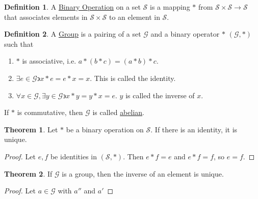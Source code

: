 \documentclass{article}
\newcommand{\Group}{\mathcal{G}}
\theoremstyle{definition}
\newtheorem{definition}{Definition}[section]
\newtheorem{theorem}{Theorem}[section]
\begin{document}
    \theoremstyle{definition}
    \begin{definition}
        A \underline{Binary Operation} on a set $\mathcal{S}$ is a mapping $*$ from
        $\mathcal{S}\times\mathcal{S}\to\mathcal{S}$ that associates elements in $\mathcal{S}\times\mathcal{S}$ to an
        element in $\mathcal{S}$.
    \end{definition}

    \theoremstyle{definition}
    \begin{definition}
        A \underline{Group} is a pairing of a set $\Group$ and a binary operator $*$ $(\Group,*)$ such that
        \begin{enumerate}
            \item $*$ is associative, i.e. $a*(b*c) = (a*b)*c$.
            \item $\exists e\in\Group \backepsilon x*e=e*x=x$. This is called the identity.
            \item $\forall x\in\Group, \exists y\in\Group \backepsilon x*y = y*x =e$. $y$ is called the inverse of $x$.
        \end{enumerate}
        If $*$ is commutative, then $\Group$ is called \underline{abelian}.
    \end{definition}

    \begin{theorem}
        Let $*$ be a binary operation on $\mathcal{S}$. If there is an identity, it is unique.
    \end{theorem}
    \begin{proof}
        Let $e,f$ be identities in $(\mathcal{S},*)$. Then $e*f=e$ and $e*f=f$, so $e=f$.
    \end{proof}

    \begin{theorem}
        If $\Group$ is a group, then the inverse of an element is unique.
    \end{theorem}
    \begin{proof}
        Let $a\in\Group$ with $a''$ and $a'$    
    \end{proof}
\end{document}

